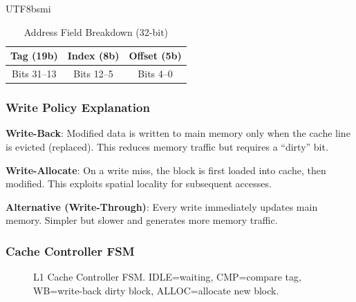 \documentclass[journal,twoside]{IEEEtran}
\begin{document}
\begin{CJK}{UTF8}{bsmi}
\begin{table}[!t]
\centering
\caption{Address Field Breakdown (32-bit)}
\label{tab:addrbreak}
\footnotesize
\begin{tabular}{ccc}
\toprule
\textbf{Tag (19b)} & \textbf{Index (8b)} & \textbf{Offset (5b)} \\
\midrule
Bits 31--13 & Bits 12--5 & Bits 4--0 \\
\bottomrule
\end{tabular}
\end{table}

\subsubsection{Write Policy Explanation}
\textbf{Write-Back}: Modified data is written to main memory only when the cache line is evicted (replaced). This reduces memory traffic but requires a ``dirty'' bit.

\textbf{Write-Allocate}: On a write miss, the block is first loaded into cache, then modified. This exploits spatial locality for subsequent accesses.

\textbf{Alternative (Write-Through)}: Every write immediately updates main memory. Simpler but slower and generates more memory traffic.

\subsubsection{Cache Controller FSM}
\begin{figure}[!t]
\centering
{}
\caption{L1 Cache Controller FSM. IDLE=waiting, CMP=compare tag, WB=write-back dirty block, ALLOC=allocate new block.}
\label{fig:cache}
\end{figure}


\end{CJK}
\end{document}
